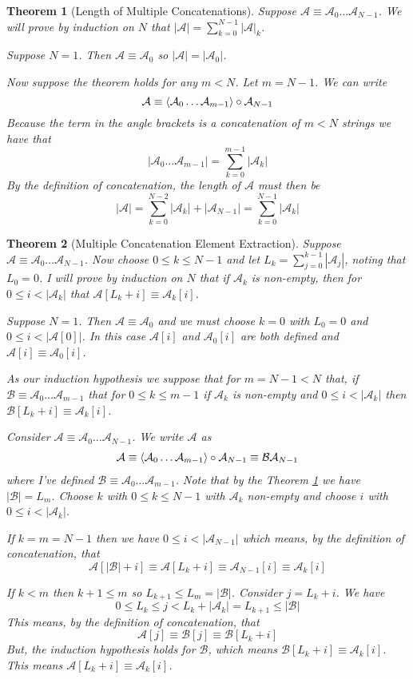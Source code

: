 \documentclass[12pt]{article}
\theoremstyle{break}
\theoremstyle{break}
\newtheorem{theorem}{Theorem}[section]
\theoremstyle{break}
\theoremstyle{break}
\newcommand{\mc}[1]{\mathcal{#1}}
\begin{document}
\begin{theorem}[Length of Multiple Concatenations]
\label{thm:multconcat}
Suppose $\mc{A} \equiv \mc{A}_0 \ldots \mc{A}_{N-1}$.
We will prove by induction on $N$ that $|\mc{A}| = \sum_{k=0}^{N-1} |\mc{A}|_k$.

Suppose $N=1$.
Then $\mc{A} \equiv \mc{A}_0$ so $|\mc{A}| = |\mc{A}_0|$.

Now suppose the theorem holds for any $m<N$. 
Let $m=N-1$.
We can write
$$
\mc{A} \equiv \Braket{\mc{A}_0 \ldots \mc{A}_{m-1}} \circ \mc{A}_{N-1}
$$
Because the term in the angle brackets is a concatenation of $m<N$ strings we have that 
$$
|\mc{A}_0\ldots \mc{A}_{m-1}| = \sum_{k=0}^{m-1} |\mc{A}_k|
$$
By the definition of concatenation, the length of $\mc{A}$ must then be
$$
|\mc{A}| = \sum_{k=0}^{N-2} |\mc{A}_k| + |\mc{A}_{N-1}| = \sum_{k=0}^{N-1}|\mc{A}_k|
$$
\end{theorem}

\begin{theorem}[Multiple Concatenation Element Extraction]
\label{thm:multconcatextract}
Suppose $\mc{A} \equiv \mc{A}_0\ldots\mc{A}_{N-1}$.
Now choose $0\le k \le N-1$ and let $L_k = \sum_{j=0}^{k-1} |\mc{A}_j|$, noting that $L_0=0$.
I will prove by induction on $N$ that if $\mc{A}_k$ is non-empty, then for $0 \le i < |\mc{A}_k|$ that $\mc{A}[L_k + i] \equiv \mc{A}_k[i]$.

Suppose $N=1$.
Then $\mc{A} \equiv \mc{A}_0$ and we must choose $k=0$ with $L_0=0$ and $0 \le i < |\mc{A}[0]|$.
In this case $\mc{A}[i]$ and $\mc{A}_0[i]$ are both defined and $\mc{A}[i] \equiv \mc{A}_0[i]$.

As our induction hypothesis we suppose that for $m = N-1 < N$ that, if $\mc{B}\equiv \mc{A}_0 \ldots \mc{A}_{m-1}$ that for $0\le k \le m-1$ if $\mc{A}_k$ is non-empty and $0 \le i < |\mc{A}_k|$ then $\mc{B}[L_k+i] \equiv \mc{A}_k[i]$.

Consider $\mc{A} \equiv \mc{A}_0 \ldots \mc{A}_{N-1}$.
We write $\mc{A}$ as
\begin{align*}
\mc{A} \equiv \Braket{\mc{A}_0\ldots \mc{A}_{m-1}} \circ \mc{A}_{N-1} \equiv \mc{B}\mc{A}_{N-1}
\end{align*}
where I've defined $\mc{B} \equiv \mc{A}_0 \ldots \mc{A}_{m-1}$.
Note that by the Theorem \ref{thm:multconcat} we have $|\mc{B}| = L_m$.
Choose $k$ with $0 \le k \le N-1$ with $\mc{A}_k$ non-empty and choose $i$ with $0 \le i < |\mc{A}_k|$.

If $k=m=N-1$ then we have $0\le i < |\mc{A}_{N-1}|$ which means, by the definition of concatenation, that
$$
\mc{A}[|\mc{B}|+i] \equiv \mc{A}[L_k+i] \equiv \mc{A}_{N-1}[i] \equiv \mc{A}_k[i]
$$

If $k < m$ then $k+1 \le m$ so $L_{k+1} \le L_m = |\mc{B}|$.
Consider $j = L_k + i$.
We have 
$$
0\le L_k \le j < L_k + |\mc{A}_k| = L_{k+1} \le |\mc{B}|
$$
This means, by the definition of concatenation, that
$$
\mc{A}[j] \equiv \mc{B}[j] \equiv \mc{B}[L_k + i]
$$
But, the induction hypothesis holds for $\mc{B}$, which means $\mc{B}[L_k+i] \equiv \mc{A}_k[i]$.
This means $\mc{A}[L_k+i] \equiv \mc{A}_k[i]$.

\end{theorem}
\end{document}
